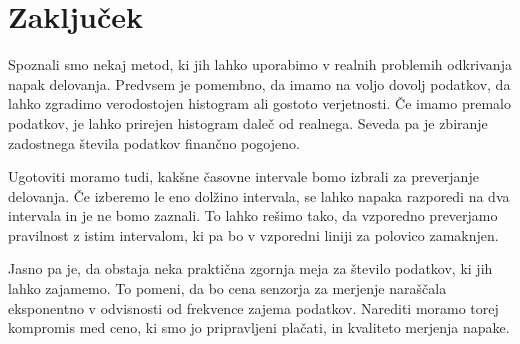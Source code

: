 \documentclass[a4paper, 12pt]{article}
\theoremstyle{definition}
\begin{document}













\section{Zaključek}

Spoznali smo nekaj metod, ki jih lahko uporabimo v realnih problemih odkrivanja napak delovanja. Predvsem je pomembno, da imamo na voljo dovolj podatkov, da lahko zgradimo verodostojen histogram ali gostoto verjetnosti. Če imamo premalo podatkov, je lahko prirejen histogram daleč od realnega. Seveda pa je zbiranje zadostnega števila podatkov finančno pogojeno.

Ugotoviti moramo tudi, kakšne časovne intervale bomo izbrali za preverjanje delovanja. Če izberemo le eno dolžino intervala, se lahko napaka razporedi na dva intervala in je ne bomo zaznali. To lahko rešimo tako, da vzporedno preverjamo pravilnost z istim intervalom, ki pa bo v vzporedni liniji za polovico zamaknjen.

Jasno pa je, da obstaja neka praktična zgornja meja za število podatkov, ki jih lahko zajamemo. To pomeni, da bo cena senzorja za merjenje naraščala eksponentno v odvisnosti od frekvence zajema podatkov. Narediti moramo torej kompromis med ceno, ki smo jo pripravljeni plačati, in kvaliteto merjenja napake.

\newpage


% 
\end{document}
